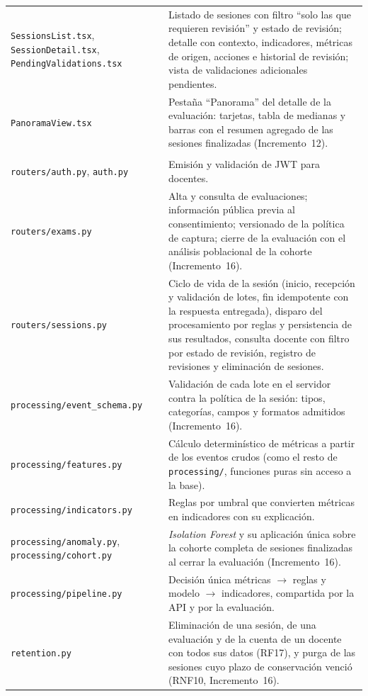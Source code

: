 {\begin{longtable}{>{\raggedright\arraybackslash}p{4.9cm} >{\raggedright\arraybackslash}p{10.1cm}}
        \texttt{SessionsList.tsx}, \texttt{SessionDetail.tsx}, \texttt{PendingValidations.tsx} & Listado de sesiones con filtro ``solo las que requieren revisión'' y estado de revisión; detalle con contexto, indicadores, métricas de origen, acciones e historial de revisión; vista de validaciones adicionales pendientes. \\
        \texttt{PanoramaView.tsx} & Pestaña ``Panorama'' del detalle de la evaluación: tarjetas, tabla de medianas y barras con el resumen agregado de las sesiones finalizadas (Incremento~12). \\
        \midrule
        \multicolumn{2}{l}{\textit{Backend (Python + FastAPI, SQLAlchemy)}} \\
        \texttt{routers/auth.py}, \texttt{auth.py} & Emisión y validación de JWT para docentes. \\
        \texttt{routers/exams.py} & Alta y consulta de evaluaciones; información pública previa al consentimiento; versionado de la política de captura; cierre de la evaluación con el análisis poblacional de la cohorte (Incremento~16). \\
        \texttt{routers/sessions.py} & Ciclo de vida de la sesión (inicio, recepción y validación de lotes, fin idempotente con la respuesta entregada), disparo del procesamiento por reglas y persistencia de sus resultados, consulta docente con filtro por estado de revisión, registro de revisiones y eliminación de sesiones. \\
        \texttt{processing/event\_schema.py} & Validación de cada lote en el servidor contra la política de la sesión: tipos, categorías, campos y formatos admitidos (Incremento~16). \\
        \texttt{processing/features.py} & Cálculo determinístico de métricas a partir de los eventos crudos (como el resto de \texttt{processing/}, funciones puras sin acceso a la base). \\
        \texttt{processing/indicators.py} & Reglas por umbral que convierten métricas en indicadores con su explicación. \\
        \texttt{processing/anomaly.py}, \texttt{processing/cohort.py} & \textit{Isolation Forest} y su aplicación única sobre la cohorte completa de sesiones finalizadas al cerrar la evaluación (Incremento~16). \\
        \texttt{processing/pipeline.py} & Decisión única métricas $\to$ reglas y modelo $\to$ indicadores, compartida por la API y por la evaluación. \\
        \texttt{retention.py} & Eliminación de una sesión, de una evaluación y de la cuenta de un docente con todos sus datos (RF17), y purga de las sesiones cuyo plazo de conservación venció (RNF10, Incremento~16). \\

\end{longtable}}
